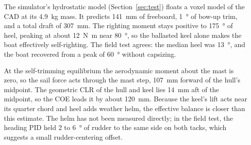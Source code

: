 The simulator's hydrostatic model (Section~\ref{sec:test}) floats a voxel
model of the CAD at its \SI{4.9}{\kilo\gram} mass. It predicts
\SI{141}{\milli\meter} of freeboard, \SI{1}{\degree} of bow-up trim, and a
total draft of \SI{307}{\milli\meter}. The righting moment stays positive to
\SI{175}{\degree} of heel, peaking at about \SI{12}{\newton\meter} near
\SI{80}{\degree}, so the ballasted keel alone makes the boat effectively
self-righting. The field test agrees: the median heel was \SI{13}{\degree},
and the boat recovered from a peak of \SI{60}{\degree} without capsizing.

At the self-trimming equilibrium the aerodynamic moment about the mast is
zero, so the sail force acts through the mast step,
\SI{107}{\milli\meter} forward of the hull's midpoint. The geometric CLR of
the hull and keel lies \SI{14}{\milli\meter} aft of the midpoint, so the COE
leads it by about \SI{120}{\milli\meter}. Because the keel's lift acts near
its quarter chord and heel adds weather helm, the effective balance is closer
than this estimate. The helm has not been measured directly; in the field
test, the heading PID held 2 to \SI{6}{\degree} of rudder to the same side on
both tacks, which suggests a small rudder-centering offset.
